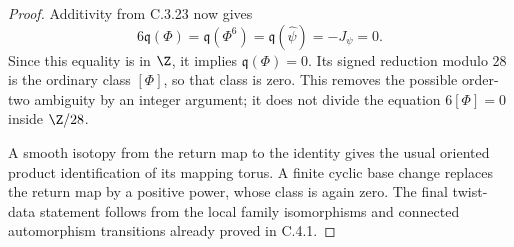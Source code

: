 \begin{proof}
Additivity from C.3.23 now gives
\[
 6\mathfrak q(\Phi)=\mathfrak q(\Phi^6)
                   =\mathfrak q(\widehat\psi)=-J_\psi=0.
\]
Since this equality is in $\Z$, it implies
$\mathfrak q(\Phi)=0$. Its signed reduction modulo $28$
is the ordinary class $[\Phi]$, so that class is zero.
This removes the possible order-two ambiguity by an integer
argument; it does not divide the equation $6[\Phi]=0$ inside
$\Z/28$.

A smooth isotopy from the return map to the identity gives
the usual oriented product identification of its mapping
torus. A finite cyclic base change replaces the return map
by a positive power, whose class is again zero. The final
twist-data statement follows from the local family isomorphisms
and connected automorphism transitions already proved in C.4.1.
\end{proof}
